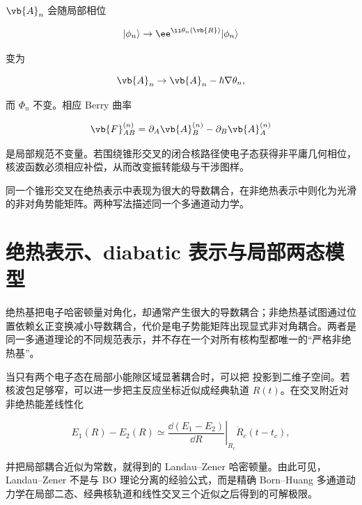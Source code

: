 \(\vb{A}_n\) 会随局部相位

\[
|\phi_n\rangle\to \ee^{\ii\theta_n(\vb{R})}|\phi_n\rangle
\]

变为

\[
\vb{A}_n\to\vb{A}_n-\hbar\nabla\theta_n,
\]

而 \(\Phi_n\) 不变。相应 Berry 曲率

\begin{equation}
\vb{F}_{AB}^{(n)}
=\partial_A\vb{A}_B^{(n)}
-\partial_B\vb{A}_A^{(n)}
\label{eq:berry-curvature}
\end{equation}

是局部规范不变量。若围绕锥形交叉的闭合核路径使电子态获得非平庸几何相位，核波函数必须相应补偿，从而改变振转能级与干涉图样。

同一个锥形交叉在绝热表示中表现为很大的导数耦合，在非绝热表示中则化为光滑的非对角势能矩阵。两种写法描述同一个多通道动力学。

\section{绝热表示、diabatic 表示与局部两态模型}

绝热基把电子哈密顿量对角化，却通常产生很大的导数耦合；非绝热基试图通过位置依赖幺正变换减小导数耦合，代价是电子势能矩阵出现显式非对角耦合。两者是同一多通道理论的不同规范表示，并不存在一个对所有核构型都唯一的“严格非绝热基”。

当只有两个电子态在局部小能隙区域显著耦合时，可以把  投影到二维子空间。若核波包足够窄，可以进一步把主反应坐标近似成经典轨道 \(R(t)\)。在交叉附近对非绝热能差线性化

\[
E_1(R)-E_2(R)
\simeq \left.\frac{\dd(E_1-E_2)}{\dd R}\right|_{R_c}
\dot R_c(t-t_c),
\]

并把局部耦合近似为常数，就得到的 Landau--Zener 哈密顿量。由此可见，Landau--Zener 不是与 BO 理论分离的经验公式，而是精确 Born--Huang 多通道动力学在局部二态、经典核轨道和线性交叉三个近似之后得到的可解极限。

